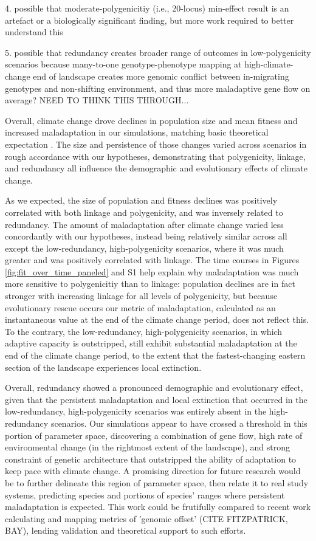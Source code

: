 \documentclass[9pt,twocolumn,twoside,lineno]{pnas-new}
\begin{document}
 4. possible that moderate-polygenicitiy (i.e., 20-locus) min-effect result is an artefact or a biologically significant finding, but more work required to better understand this

 5. possible that redundancy creates broader range of outcomes in low-polygenicity scenarios because many-to-one genotype-phenotype mapping at high-climate-change end of landscape creates more genomic conflict between in-migrating genotypes and non-shifting environment, and thus more maladaptive gene flow on average? NEED TO THINK THIS THROUGH...


Overall, climate change drove declines
in population size and mean fitness and increased
maladaptation in our simulations,
matching basic theoretical expectation \cite{aitken_whitlock}.
The size and persistence of those changes varied across scenarios
in rough accordance with our hypotheses, demonstrating that
polygenicity, linkage, and redundancy all influence
the demographic and evolutionary effects of climate change.


As we expected, the size of population and fitness declines was 
positively correlated with both linkage and polygenicity, and was
inversely related to redundancy.
The amount of maladaptation after climate change
varied less concordantly with our hypotheses,
instead being relatively similar across all except the
low-redundancy, high-polygenicity scenarios,
where it was much greater and was positively correlated with linkage.
The time courses in Figures \ref{fig:fit_over_time_paneled} and S1 help explain
why maladaptation was much more sensitive to polygenicitiy than to linkage:
population declines are in fact stronger with increasing linkage for all
levels of polygenicity, but because evolutionary rescue occurs
our metric of maladaptation, calculated as an instantaneous value 
at the end of the climate change period, does not reflect this.
To the contrary, the low-redundancy, high-polygenicity scenarios,
in which adaptive capacity is outstripped,
still exhibit substantial maladaptation at the end of the climate
change period, to the extent that the fastest-changing
eastern section of the landscape experiences local extinction.

Overall, redundancy showed a pronounced demographic and evolutionary effect,
given that the persistent maladaptation and local extinction
that occurred in the low-redundancy, high-polygenicity scenarios
was entirely absent in the high-redundancy scenarios.
Our simulations appear to have crossed a threshold in this portion of parameter
space, discovering a combination of gene flow, high rate of environmental change
(in the rightmost extent of the landscape), and strong constraint of
genetic architecture that outstripped the ability of adaptation to keep pace
with climate change. A promising direction for future research
would be to further delineate this region of parameter space,
then relate it to real study systems, predicting species and portions of
species' ranges where persistent maladaptation is expected.
This work could be frutifully compared to recent work calculating
and mapping metrics of 'genomic offset' (CITE FITZPATRICK, BAY),
lending validation and theoretical support to such efforts.
\end{document}
